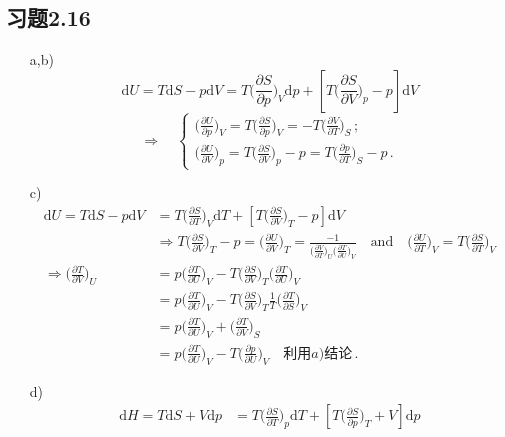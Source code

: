 \documentclass[letterpaper, 10pt]{article}
\newcommand{\dd}{\mathrm{d}}
\begin{document}
\subsection{习题2.16}
\begin{itemize}
	\item[a,b)]
	\[ \dd U = T \dd S - p \dd V = T \bigg( \frac{\partial S}{\partial p} \bigg)_{V} \dd p + \left[ T \bigg( \frac{\partial S}{\partial V} \bigg)_{p} - p \right] \dd V \]
	\[ \Rightarrow \quad{}
	\begin{cases}
	\big( \frac{\partial U}{\partial p} \big)_{V} = T \big( \frac{\partial S}{\partial p} \big)_{V} = - T \big( \frac{\partial V}{\partial T} \big)_{S} \,;\\
	\big( \frac{\partial U}{\partial V} \big)_{p} = T \big( \frac{\partial S}{\partial V} \big)_{p} - p = T \big( \frac{\partial p}{\partial T} \big)_{S} - p \,.
	\end{cases} \]
	\item[c)]
	\begin{align*}
	\dd U = T \dd S - p \dd V & = T \bigg( \frac{\partial S}{\partial T} \bigg)_{V} \dd T + \left[ T \bigg( \frac{\partial S}{\partial V} \bigg)_{T} - p \right] \dd V \\
	& \Rightarrow T \bigg( \frac{\partial S}{\partial V} \bigg)_{T} - p = \bigg( \frac{\partial U}{\partial V} \bigg)_{T} 
	= \frac{-1}{\big( \frac{\partial V}{\partial T} \big)_{U} \big( \frac{\partial T}{\partial U} \big)_{V}} \quad{} \text{and} \quad{}
	\bigg( \frac{\partial U}{\partial T} \bigg)_{V} = T \bigg( \frac{\partial S}{\partial T} \bigg)_{V} \\
	\Rightarrow \bigg( \frac{\partial T}{\partial V} \bigg)_{U} 
	& = p \bigg( \frac{\partial T}{\partial U} \bigg)_{V} - T \bigg( \frac{\partial S}{\partial V} \bigg)_{T} \bigg( \frac{\partial T}{\partial U} \bigg)_{V} \\
	& = p \bigg( \frac{\partial T}{\partial U} \bigg)_{V} - T \bigg( \frac{\partial S}{\partial V} \bigg)_{T} \frac{1}{T} \bigg( \frac{\partial T}{\partial S} \bigg)_{V} \\
	& = p \bigg( \frac{\partial T}{\partial U} \bigg)_{V} + \bigg( \frac{\partial T}{\partial V} \bigg)_{S} \\
	& = p \bigg( \frac{\partial T}{\partial U} \bigg)_{V} - T \bigg( \frac{\partial p}{\partial U} \bigg)_{V} \quad{} \text{利用$a)$结论} \,.
	\end{align*}
	\item[d)]
	\begin{align*}
	\dd H = T \dd S + V \dd p & = T \bigg( \frac{\partial S}{\partial T} \bigg)_{p} \dd T + \left[ T \bigg( \frac{\partial S}{\partial p} \bigg)_{T} + V \right] \dd p \\

\end{align*}
\end{itemize}
\end{document}

